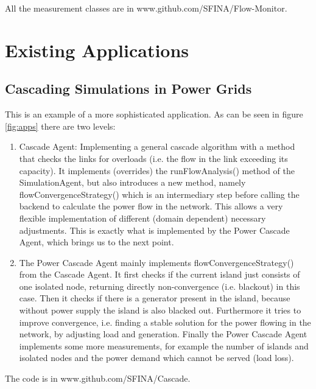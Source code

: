 \documentclass[11pt,fleqn]{book} %
\newcommand{\CascadeAgent}{CascadeAgent}
\newcommand{\backend}[1][]{backend#1}
\newcommand{\domain}[1][]{domain#1}
\begin{document}
All the measurement classes are in www.github.com/SFINA/Flow-Monitor.


\section{Existing Applications}\label{sec:existing_apps}

\subsection{Cascading Simulations in Power Grids}\index{Agent!Power\CascadeAgent{}}
This is an example of a more sophisticated application. As can be seen in figure \ref{fig:apps} there are two levels:
\begin{enumerate}
	\item Cascade Agent: Implementing a general cascade algorithm with a method that checks the links for overloads (i.e. the flow in the link exceeding its capacity). It implements (overrides) the runFlowAnalysis() method of the SimulationAgent, but also introduces a new method, namely flowConvergenceStrategy() which is an intermediary step before calling the \backend{} to calculate the power flow in the network. This allows a very flexible implementation of different (\domain{} dependent) necessary adjustments. This is exactly what is implemented by the Power Cascade Agent, which brings us to the next point.
	\item The Power Cascade Agent mainly implements flowConvergenceStrategy() from the Cascade Agent. It first checks if the current island just consists of one isolated node, returning directly non-convergence (i.e. blackout) in this case. Then it checks if there is a generator present in the island, because without power supply the island is also blacked out. Furthermore it tries to improve convergence, i.e. finding a stable solution for the power flowing in the network, by adjusting load and generation. Finally the Power Cascade Agent implements some more measurements, for example the number of islands and isolated nodes and the power demand which cannot be served (load loss).
\end{enumerate}
The code is in www.github.com/SFINA/Cascade.
\end{document}
